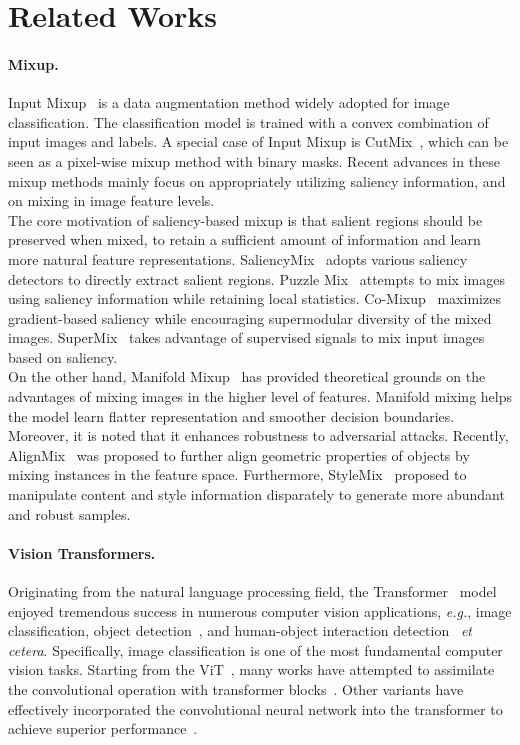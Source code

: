 \documentclass{article}
\begin{document}
 \section{Related Works}
\label{section:relworks}
\paragraph{Mixup.}
Input Mixup~\cite{zhang2017mixup} is a data augmentation method widely adopted for image classification.
The classification model is trained with a convex combination of input images and labels.
A special case of Input Mixup is CutMix~\cite{yun2019cutmix}, which can be seen as a pixel-wise mixup method with binary masks.
Recent advances in these mixup methods mainly focus on appropriately utilizing saliency information, and on mixing in image feature levels.\\
The core motivation of saliency-based mixup is that salient regions should be preserved when mixed, to retain a sufficient amount of information and learn more natural feature representations.
SaliencyMix~\cite{uddin2020saliencymix} adopts various saliency detectors to directly extract salient regions.
Puzzle Mix~\cite{kim2020puzzle} attempts to mix images using saliency information while retaining local statistics.
Co-Mixup~\cite{kim2021co} maximizes gradient-based saliency while encouraging supermodular diversity of the mixed images.
SuperMix~\cite{dabouei2021supermix} takes advantage of supervised signals to mix input images based on saliency.\\
On the other hand, Manifold Mixup~\cite{verma2019manifold} has provided theoretical grounds on the advantages of mixing images in the higher level of features.
Manifold mixing helps the model learn flatter representation and smoother decision boundaries.
Moreover, it is noted that it enhances robustness to adversarial attacks.
Recently, AlignMix~\cite{venkataramanan2021alignmix} was proposed to further align geometric properties of objects by mixing instances in the feature space.
Furthermore, StyleMix~\cite{hong2021stylemix} proposed to manipulate content and style information disparately to generate more abundant and robust samples.

\paragraph{Vision Transformers.}
Originating from the natural language processing field, the Transformer~\cite{vaswani2017attention} model enjoyed tremendous success in numerous computer vision applications, \textit{e.g.}, image classification, object detection~\cite{carion2020end,zhu2020deformable}, and human-object interaction detection~\cite{kim2021hotr,park2022consistency} \textit{et cetera}.
Specifically, image classification is one of the most fundamental computer vision tasks.
Starting from the ViT~\cite{dosovitskiy2020image}, many works have attempted to assimilate the convolutional operation with transformer blocks~\cite{liu2021swin, wang2021pyramid, yuan2021incorporating, heo2021rethinking, han2021transformer, d2021convit}.
Other variants have effectively incorporated the convolutional neural network into the transformer to achieve superior performance~\cite{hassani2021escaping, wu2021cvt, xu2021co, chu2021conditional, chu2021twins}.
\end{document}
